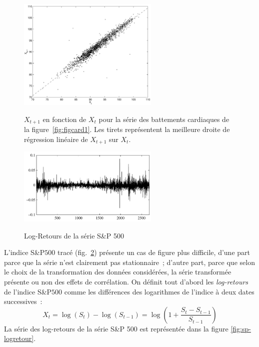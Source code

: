 \begin{figure}
  \centering
  \includegraphics[width=0.6\textwidth]{Figures/cov_hr11839}\\
  \caption{$X_{t+1}$ en fonction de $X_t$ pour la s\'erie
 des battements cardiaques de la figure~\ref{fig:figcard1}. Les tirets
 repr\'esentent la meilleure droite de r\'egression lin\'eaire de $X_{t+1}$ sur $X_t$.}
 \label{fig:xcov}
\end{figure}

\begin{figure}
  \centering
  \includegraphics[width=0.6\textwidth]{Figures/logretourSP}\\
  \caption{Log-Retours de la s\'erie S\&P 500}\label{fig:SP}
\end{figure}
 L'indice S\&P$500$ trac\'e (fig.~\ref{fig:SP}) pr\'esente un cas de figure plus
 difficile, d'une part parce que la s\'erie n'est clairement pas
 stationnaire~; d'autre part, parce que selon le choix de la transformation des
 donn\'ees consid\'er\'ees, la s\'erie transform\'ee pr\'esente ou non des effets de
 corr\'elation. On d\'efinit tout d'abord les \emph{log-retours} de l'indice
 S\&P$500$ comme les diff\'erences des logarithmes de l'indice \`a deux dates
 successives~:
\[
 X_{t} = \log( S_{t}) - \log(S_{t-1})
      = \log \left( 1 + \frac{S_{t}-S_{t-1}}{S_{t-1}} \right)
\]
La s\'erie des log-retours de la s\'erie S\&P 500 est repr\'esent\'ee dans la
figure \ref{fig:sp-logretour}.

